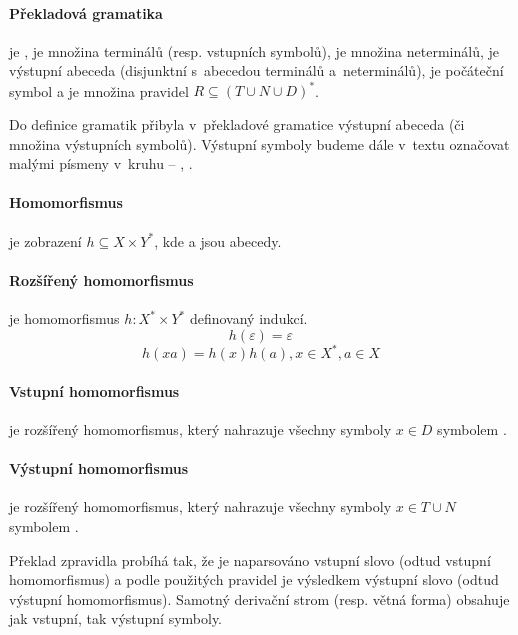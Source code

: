 		\paragraph{Překladová gramatika}
		je \TranslateGrammarDef,  je množina terminálů (resp. vstupních symbolů),  je množina neterminálů,  je výstupní abeceda (disjunktní s~abecedou terminálů a~neterminálů),  je počáteční symbol a  je množina pravidel $R\subseteq{\left(T \cup N \cup D\right)}^{\ast}$.
		
		\vspace{1em}
		
		Do definice gramatik přibyla v~překladové gramatice výstupní abeceda (či množina výstupních symbolů). Výstupní symboly budeme dále v~textu označovat malými písmeny v~kruhu -- , .
		
		\paragraph{Homomorfismus}
		je zobrazení $h\subseteq X \times Y^\ast$, kde  a  jsou abecedy.
		\paragraph{Rozšířený homomorfismus}
		je homomorfismus $h:X^*\times Y^*$ definovaný indukcí.
		$$h(\varepsilon)=\varepsilon$$
		$$h(xa)=h(x)h(a), x\in X^*, a\in X$$		
		\paragraph{Vstupní homomorfismus}
		je rozšířený homomorfismus, který nahrazuje všechny symboly $x\in D$ symbolem \Eps.
		\paragraph{Výstupní homomorfismus}
		je rozšířený homomorfismus, který nahrazuje všechny symboly $x\in T \cup N$ symbolem \Eps.
		
		\vspace{1em}
		
		Překlad zpravidla probíhá tak, že je naparsováno vstupní slovo (odtud vstupní homomorfismus) a podle použitých pravidel je výsledkem výstupní slovo (odtud výstupní homomorfismus). Samotný derivační strom (resp. větná forma) obsahuje jak vstupní, tak výstupní symboly.
		
